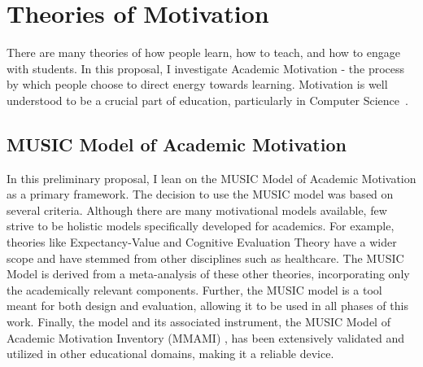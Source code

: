 \section{Theories of Motivation}

There are many theories of how people learn, how to teach, and how to engage with students. 
In this proposal, I investigate Academic Motivation - the process by which people choose to direct energy towards learning.
Motivation is well understood to be a crucial part of education, particularly in Computer Science~\cite{Carter:2011}.

\subsection{MUSIC Model of Academic Motivation}

In this preliminary proposal, I lean on the MUSIC Model of Academic Motivation as a primary framework.
The decision to use the MUSIC model was based on several criteria.
Although there are many motivational models available, few strive to be holistic models specifically developed for academics.
For example, theories like Expectancy-Value and Cognitive Evaluation Theory have a wider scope and have stemmed from other disciplines such as healthcare. %
The MUSIC Model is derived from a meta-analysis of these other theories, incorporating only the academically relevant components.
Further, the MUSIC model is a tool meant for both design and evaluation, allowing it to be used in all phases of this work.
Finally, the model and its associated instrument, the MUSIC Model of Academic Motivation Inventory (MMAMI) , has been extensively validated and utilized in other educational domains, making it a reliable device\cite{jones-validity}.

